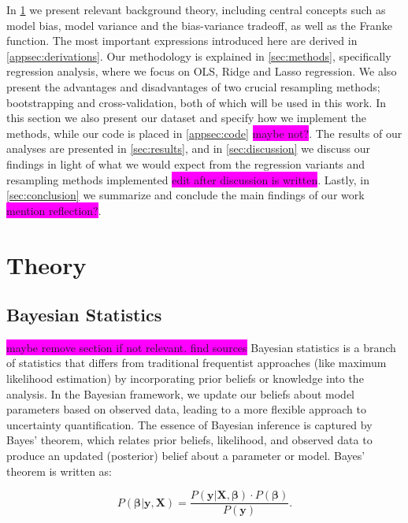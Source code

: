 \documentclass[aps,pra,english,notitlepage,reprint,nofootinbib]{revtex4-1}  %
\begin{document}
In \cref{sec:theory} we present relevant background theory, including central concepts such as model bias, model variance and the bias-variance tradeoff, as well as the Franke function. The most important expressions introduced here are derived in \cref{appsec:derivations}. Our methodology is explained in \cref{sec:methods}, specifically regression analysis, where we focus on OLS, Ridge and Lasso regression. We also present the advantages and disadvantages of two crucial resampling methods; bootstrapping and cross-validation, both of which will be used in this work. In this section we also present our dataset and specify how we implement the methods, while our code is placed in \cref{appsec:code} \colorbox{magenta}{maybe not?}. The results of our analyses are presented in \cref{sec:results}, and in \cref{sec:discussion} we discuss our findings in light of what we would expect from the regression variants and resampling methods implemented \colorbox{magenta}{edit after discussion is written}. Lastly, in \cref{sec:conclusion} we summarize and conclude the main findings of our work \colorbox{magenta}{mention reflection?}. 

\section{Theory}\label{sec:theory}
\subsection{Bayesian Statistics}
\colorbox{magenta}{maybe remove section if not relevant. find sources}
Bayesian statistics is a branch of statistics that differs from traditional frequentist approaches (like maximum likelihood estimation) by incorporating prior beliefs or knowledge into the analysis. In the Bayesian framework, we update our beliefs about model parameters based on observed data, leading to a more flexible approach to uncertainty quantification. The essence of Bayesian inference is captured by Bayes' theorem, which relates prior beliefs, likelihood, and observed data to produce an updated (posterior) belief about a parameter or model. Bayes' theorem is written as:

\begin{equation}
  P(\boldsymbol{\beta} | \mathbf{y}, \mathbf{X}) = \frac{P(\mathbf{y} | \mathbf{X}, \boldsymbol{\beta}) \cdot P(\boldsymbol{\beta})}{P(\mathbf{y})}.
\end{equation}
\end{document}
